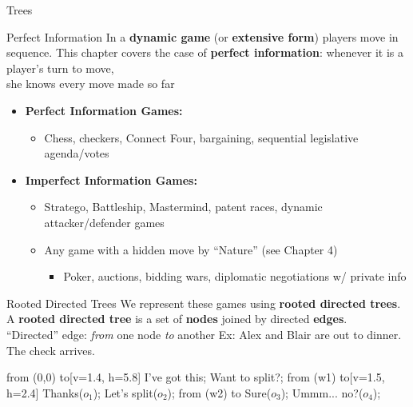 
\begin{frame}[standout]
Trees
\end{frame}

\begin{frame}{Perfect Information}
In a \textbf{dynamic game} (or \textbf{extensive form}) players move in sequence.
\bsk
This chapter covers the case of \textbf{perfect information}:
\vfill
\centering
\large
whenever it is a player's turn to move,\\ she knows every move made so far
\vfill
\normalsize
\raggedright
\begin{itemize}
    \item \textbf{Perfect Information Games:}
    \begin{itemize}
        \item Chess, checkers, Connect Four, bargaining, sequential legislative agenda/votes
    \end{itemize}
    \item \textbf{Imperfect Information Games:}
    \begin{itemize}
        \item Stratego, Battleship, Mastermind, patent races, dynamic attacker/defender games
        \item Any game with a hidden move by ``Nature'' (see Chapter 4)
        \begin{itemize}
            \item Poker, auctions, bidding wars, diplomatic negotiations w/ private info
        \end{itemize}
    \end{itemize}
\end{itemize}
\vspace{-0.4in}
\end{frame}

\begin{frame}{Rooted Directed Trees}
We represent these games using \textbf{rooted directed trees}.
\bsk
A \textbf{rooted directed tree} is a set of \textbf{nodes} joined by directed \textbf{edges}.\\
\hspace{1in}``Directed'' edge: \textit{from} one node \textit{to} another
\bsk
Ex: Alex and Blair are out to dinner. The check arrives.
\bsk
\centering
\begin{gametree}[player names={Alex, Blair}, scale=0.82]
  \branch[player=1, root=w, label=90] from (0,0) to[v=1.4, h=5.8]
    {I've got this; Want to split?};
  \branch[player=2, label=135] from (w1) to[v=1.5, h=2.4]
    {Thanks($o_1$); Let's split($o_2$)};
  \branch[label=45] from (w2) to {Sure($o_3$); Ummm... no?($o_4$)};
\end{gametree}
\end{frame}

